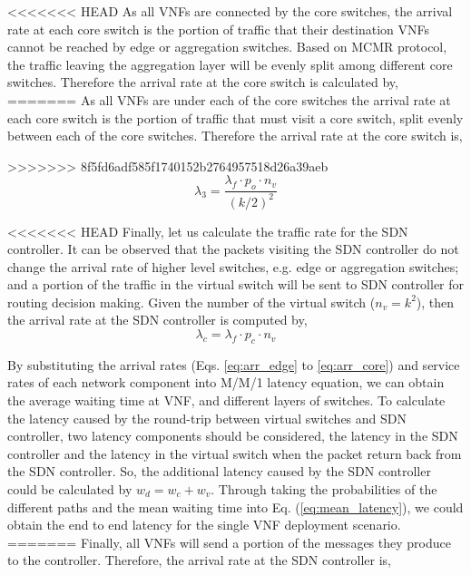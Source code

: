 <<<<<<< HEAD
As all VNFs are connected by the core switches, the arrival rate at each core switch is the portion of traffic that their destination VNFs cannot be reached by edge or aggregation switches. Based on MCMR protocol, the traffic leaving the aggregation layer will be evenly split among different core switches. Therefore the arrival rate at the core switch is calculated by, 
=======
As all VNFs are under each of the core switches the arrival rate at each core switch is the portion of traffic that must visit a core switch, split evenly between each of the core switches. Therefore the arrival rate at the core switch is,

>>>>>>> 8f5fd6adf585f1740152b2764957518d26a39aeb
\begin{equation}
\label{eq:arr_core}
\lambda _{ 3 }=\frac { { \lambda  }_{ f }\cdot p_{ o }\cdot { n }_{ v } }{ (k/2)^{ 2 } } 
\end{equation}

<<<<<<< HEAD
Finally, let us calculate the traffic rate for the SDN controller. It can be observed that the packets visiting the SDN controller do not change the arrival rate of higher level switches, e.g. edge or aggregation switches; and a portion of the traffic in the virtual switch will be sent to SDN controller for routing decision making. Given the number of the virtual switch ($n_v = k^2$), then the arrival rate at the SDN controller is computed by, 
\begin{equation}
\label{eq:arr_sdn}
\lambda _{ c }={ \lambda  }_{ f }\cdot p_{ c }\cdot { n }_{ v }
\end{equation}

By substituting the arrival rates (Eqs. \ref{eq:arr_edge} to \ref{eq:arr_core}) and service rates of each network component into M/M/1 latency equation, we can obtain the average waiting time at VNF, and different layers of switches. To calculate the latency caused by the round-trip between virtual switches and SDN controller, two latency components should be considered, the latency in the SDN controller and the latency in the virtual switch when the packet return back from the SDN controller. So, the additional latency caused by the SDN controller could be calculated by $w_{ d }={ w }_{ c }+w_{ v }$. Through taking the probabilities of the different paths and the mean waiting time into Eq. (\ref{eq:mean_latency}), we could obtain the end to end latency for the single VNF deployment scenario. 
=======
Finally, all VNFs will send a portion of the messages they produce to the controller. Therefore, the arrival rate at the SDN controller is,

